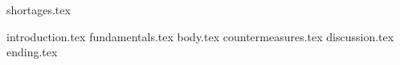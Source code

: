 \documentclass[
runningheads,
]{llncs}
\begin{document}


{shortages.tex}

\newpage

{introduction.tex}
{fundamentals.tex}
{body.tex}
{countermeasures.tex}
{discussion.tex}
{ending.tex}



\printbibliography

\end{document}
